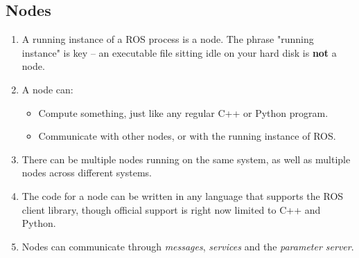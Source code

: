 \documentclass{article}
\begin{document}
        \subsection{Nodes}
            \begin{enumerate}
                \item A running instance of a ROS process is a node. The phrase "running instance" is key --
                an executable file sitting idle on your hard disk is \textbf{not} a node.
                \item A node can:
                \begin{itemize}
                    \item Compute something, just like any regular C++ or Python program.
                    \item Communicate with other nodes, or with the running instance of ROS.
                \end{itemize}
                \item There can be multiple nodes running on the same system, as well as multiple nodes across different systems.
                \item The code for a node can be written in any language that supports the ROS client library, though official support is right 
                now limited to C++ and Python.
                \item Nodes can communicate through \emph{messages}, \emph{services} and the \emph{parameter server}.
            \end{enumerate}
\end{document}
